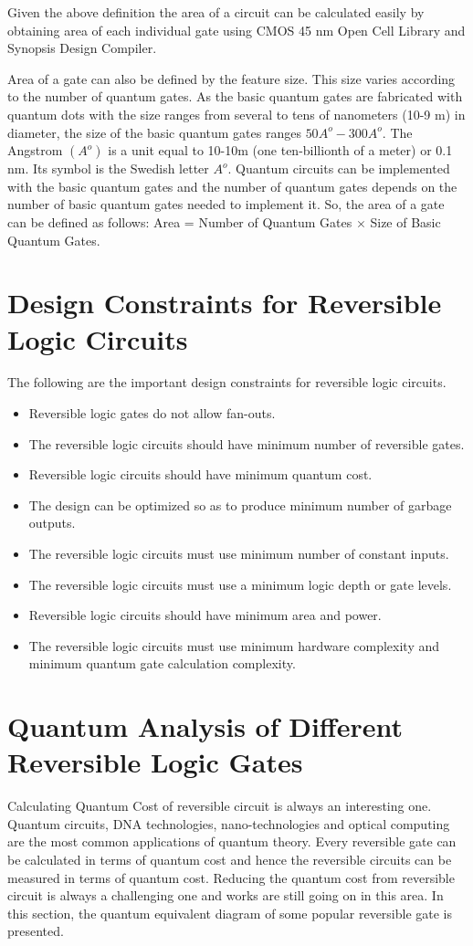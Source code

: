 Given the above definition the area of a circuit can be calculated easily by obtaining area of each individual gate using CMOS 45 nm Open Cell Library and Synopsis Design Compiler.

Area of a gate can also be defined by the feature size. This size varies according to the number of quantum gates. As the basic quantum gates are fabricated with quantum dots with the size ranges from several to tens of nanometers (10-9 m) in diameter, the size of the basic quantum gates ranges $50A^o-300A^o$. The Angstrom $(A^o)$ is a unit equal to 10-10m (one ten-billionth of a meter) or 0.1 nm. Its symbol is the Swedish letter $A^o$. Quantum circuits can be implemented with the basic quantum gates and the number of quantum gates depends on the number of basic quantum gates needed to implement it. So, the area of a gate can be defined as follows: Area = Number of Quantum Gates $\times$ Size of Basic Quantum Gates.

\section{Design Constraints for Reversible Logic Circuits}
The following are the important design constraints for reversible logic circuits.

\begin{itemize}
\item Reversible logic gates do not allow fan-outs.
\item The reversible logic circuits should have minimum number of reversible gates.
\item Reversible logic circuits should have minimum quantum cost.
\item The design can be optimized so as to produce minimum number of garbage outputs.
\item The reversible logic circuits must use minimum number of constant inputs.
\item The reversible logic circuits must use a minimum logic depth or gate levels.
\item Reversible logic circuits should have minimum area and power.
\item The reversible logic circuits must use minimum hardware complexity and minimum quantum gate calculation complexity.
\end{itemize}

\section{Quantum Analysis of Different Reversible Logic Gates}
Calculating Quantum Cost of reversible circuit is always an interesting one. Quantum circuits, DNA technologies, nano-technologies and optical computing are the most common applications of quantum theory. Every reversible gate can be calculated in terms of quantum cost and hence the reversible circuits can be measured in terms of quantum cost. Reducing the quantum cost from reversible circuit is always a challenging one and works are still going on in this area. In this section, the quantum equivalent diagram of some popular reversible gate is presented.

